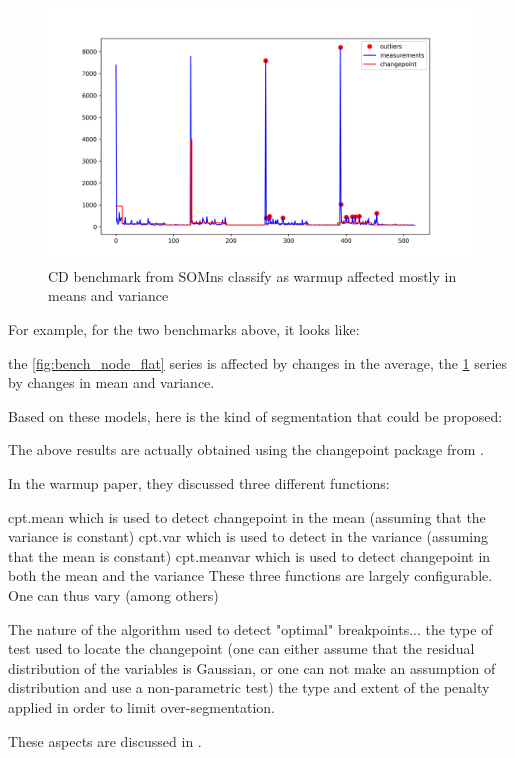 \documentclass{article}
\begin{document}
\begin{figure}[h!]
    \centering
    \includegraphics[width=1\textwidth]{images/plot_10_flat.png}
    \caption{CD benchmark from SOMns classify as warmup affected mostly in means and variance}
    \label{fig:bench_somns_flat}
\end{figure}

For example, for the two benchmarks above, it looks like:

the \ref{fig:bench_node_flat} series is affected by changes in the average,
the \ref{fig:bench_somns_flat} series by changes in mean and variance.


Based on these models, here is the kind of segmentation that could be proposed:

The above results are actually obtained using the changepoint package from \cite{killick2014changepoint}.

In the warmup paper, they discussed three different functions:

cpt.mean which is used to detect changepoint in the mean (assuming that the variance is constant)
cpt.var which is used to detect  in the variance (assuming that the mean is constant)
cpt.meanvar which is used to detect changepoint in both the mean and the variance
These three functions are largely configurable. One can thus vary (among others)

The nature of the algorithm used to detect "optimal" breakpoints...
the type of test used to locate the changepoint (one can either assume that the residual distribution of the variables is Gaussian, or one can not make an assumption of distribution and use a non-parametric test)
the type and extent of the penalty applied in order to limit over-segmentation.

These aspects are discussed in \cite{killick2014changepoint}.
\end{document}

